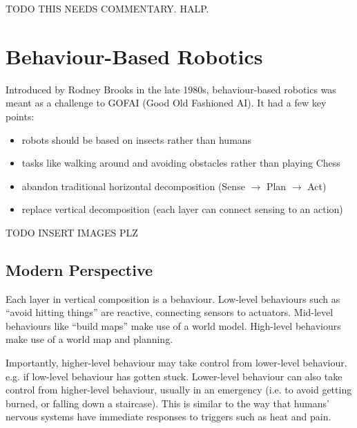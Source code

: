 TODO THIS NEEDS COMMENTARY. HALP.

\section{Behaviour-Based Robotics}
Introduced by Rodney Brooks in the late 1980s, behaviour-based robotics was
meant as a challenge to GOFAI (Good Old Fashioned AI). It had a few key points:
\begin{itemize}
    \item robots should be based on insects rather than humans
    \item tasks like walking around and avoiding obstacles rather than playing
        Chess
    \item abandon traditional horizontal decomposition (Sense $\rightarrow$
        Plan $\rightarrow$ Act)
    \item replace vertical decomposition (each layer can connect sensing to an
        action)
\end{itemize}

TODO INSERT IMAGES PLZ

\subsection{Modern Perspective}
Each layer in vertical composition is a behaviour. Low-level behaviours such as
``avoid hitting things'' are reactive, connecting sensors to actuators. Mid-level
behaviours like ``build maps'' make use of a world model. High-level behaviours
make use of a world map and planning.

Importantly, higher-level behaviour may take control from lower-level
behaviour. e.g. if low-level behaviour has gotten stuck. Lower-level behaviour
can also take control from higher-level behaviour, usually in an emergency
(i.e. to avoid getting burned, or falling down a staircase). This is similar to
the way that humans' nervous systems have immediate responses to triggers such
as heat and pain.
